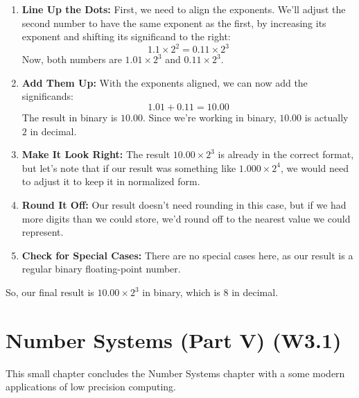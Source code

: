 \documentclass[12pt,openany]{book}
\begin{document}
			      	\begin{enumerate}
			      		\item \textbf{Line Up the Dots:} First, we need to align the exponents. We'll adjust the second number to have the same exponent as the first, by increasing its exponent and shifting its significand to the right: 
			      		      \[
			      		      	1.1 \times 2^2 = 0.11 \times 2^3
			      		      \]
			      		      Now, both numbers are $1.01 \times 2^3$ and $0.11 \times 2^3$.
			      		      
			      		\item \textbf{Add Them Up:} With the exponents aligned, we can now add the significands:
			      		      \[
			      		      	1.01 + 0.11 = 10.00
			      		      \]
			      		      The result in binary is $10.00$. Since we're working in binary, $10.00$ is actually $2$ in decimal. 
			      		      
			      		\item \textbf{Make It Look Right:} The result $10.00 \times 2^3$ is already in the correct format, but let's note that if our result was something like $1.000 \times 2^4$, we would need to adjust it to keep it in normalized form.
			      		      
			      		\item \textbf{Round It Off:} Our result doesn't need rounding in this case, but if we had more digits than we could store, we'd round off to the nearest value we could represent.
			      		      
			      		\item \textbf{Check for Special Cases:} There are no special cases here, as our result is a regular binary floating-point number.
			      	\end{enumerate}
			      	
			      	So, our final result is $10.00 \times 2^3$ in binary, which is $8$ in decimal.
			      	
			      	
			      	\chapter{Number Systems (Part V) (W3.1)}
			      	
			      	
			      	
			      	
			      	\begin{text}
			      		This small chapter concludes the Number Systems chapter with a some modern applications of low precision computing.
			      	\end{text}
\end{document}
